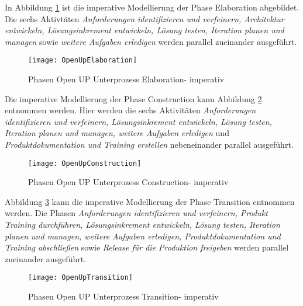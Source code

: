 In Abbildung \ref{fig:OpenUpElaboration} ist die imperative Modellierung der Phase Elaboration abgebildet. Die sechs Aktivtäten \textit{Anforderungen identifizieren und verfeinern, Architektur entwickeln, Lösungsinkrement entwickeln, Lösung testen, Iteration planen und managen} sowie \textit{weitere Aufgaben erledigen} werden parallel zueinander ausgeführt.

\begin{figure}[htp]
\begin{center}
  \texttt{[image: OpenUpElaboration]} %
  \caption{Phasen Open UP Unterprozess Elaboration- imperativ}
  \label{fig:OpenUpElaboration}
\end{center}
\end{figure}

Die imperative Modellierung der Phase Construction kann Abbildung \ref{fig:OpenUpConstruction} entnommen werden. Hier werden die sechs Aktivitäten \textit{Anforderungen identifizieren und verfeinern, Lösungsinkrement entwickeln, Lösung testen, Iteration planen und managen, weitere Aufgaben erledigen} und \textit{Produktdokumentation und Training erstellen} nebeneinander parallel ausgeführt.
\begin{figure}[htp]
\begin{center}
  \texttt{[image: OpenUpConstruction]} %
  \caption{Phasen Open UP Unterprozess Construction- imperativ}
  \label{fig:OpenUpConstruction}
\end{center}
\end{figure}

Abbildung \ref{fig:OpenUpTransition} kann die imperative Modellierung der Phase Transition entnommen werden.\newline
Die Phasen \textit{Anforderungen identifizieren und verfeinern, Produkt Training durchführen, Lösungsinkrement entwickeln, Lösung testen, Iteration planen und managen, weitere Aufgaben erledigen, Produktdokumentation und Training abschließen} sowie \textit{Release für die Produktion freigeben} werden parallel zueinander ausgeführt.

\begin{figure}[htp]
\begin{center}
  \texttt{[image: OpenUpTransition]} %
  \caption{Phasen Open UP Unterprozess Transition- imperativ}
  \label{fig:OpenUpTransition}
\end{center}
\end{figure}



